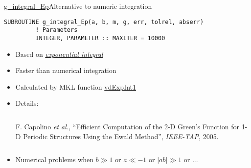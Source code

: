 
\begin{frame}{\url{g_integral_Ep}}{Alternative to numeric integration}

  \begin{lstlisting}[style=myFORTRANcodeS]
      SUBROUTINE g_integral_Ep(a, b, m, g, err, tolrel, abserr)
         ! Parameters
         INTEGER, PARAMETER :: MAXITER = 10000
  \end{lstlisting}
  
  \vbs

  \begin{itemize}\small
    \item Based on \href{https://dlmf.nist.gov/6.2}{\emph{exponential integral}}
    \item Faster than numerical integration
    \item Calculated by MKL function \url{vdExpInt1} 
    \item Details:
      \begin{columns}
        \begin{block}{}\footnotesize
          F. Capolino \emph{et al.}, ``Efficient Computation of the 2-D Green's 
          Function for 1-D Periodic Structures Using the Ewald Method'', 
          \emph{IEEE-TAP}, 2005.
        \end{block}{}
      \end{columns}
      \vbss
    \item Numerical problems when $b \gg 1$ or $a \ll -1$ or $|ab| \gg 1$ or ...

  \end{itemize}

\end{frame}


